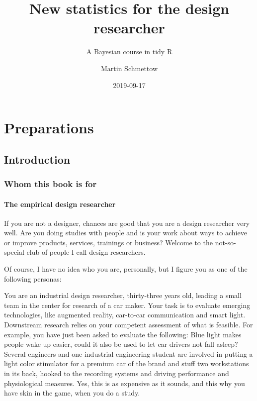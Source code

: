\documentclass[]{svmono}
\title{New statistics for the design researcher}
\subtitle{A Bayesian course in tidy R}
\author{Martin Schmettow}
\date{2019-09-17}
\begin{document}
\maketitle

{
\setcounter{tocdepth}{1}
\tableofcontents
}
\part{Preparations}\label{part-preparations}

\chapter{Introduction}\label{introduction}

\section{Whom this book is for}\label{whom-this-book-is-for}

\subsection{The empirical design
researcher}\label{the-empirical-design-researcher}

If you are not a designer, chances are good that you are a design
researcher very well. Are you doing studies with people and is your work
about ways to achieve or improve products, services, trainings or
business? Welcome to the not-so-special club of people I call design
researchers.

Of course, I have no idea who you are, personally, but I figure you as
one of the following personas:

You are an industrial design researcher, thirty-three years old, leading
a small team in the center for research of a car maker. Your task is to
evaluate emerging technologies, like augmented reality, car-to-car
communication and smart light. Downstream research relies on your
competent assessment of what is feasible. For example, you have just
been asked to evaluate the following: Blue light makes people wake up
easier, could it also be used to let car drivers not fall asleep?
Several engineers and one industrial engineering student are involved in
putting a light color stimulator for a premium car of the brand and
stuff two workstations in its back, hooked to the recording systems and
driving performance and physiological measures. Yes, this is as
expensive as it sounds, and this why you have skin in the game, when you
do a study.
\end{document}
